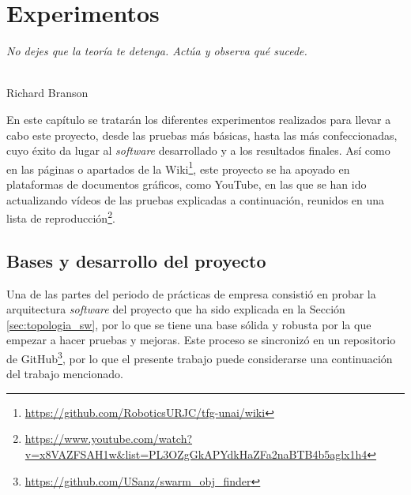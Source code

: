 \chapter{Experimentos}
\label{cap:capitulo5}

\begin{flushright}
\begin{minipage}[]{10cm}
\emph{No dejes que la teoría te detenga. Actúa y observa qué sucede.}\\
\end{minipage}\\

Richard Branson\\
\end{flushright}

\vspace{1cm}

En este capítulo se tratarán los diferentes experimentos realizados para llevar
a cabo este proyecto, desde las pruebas más básicas, hasta las más
confeccionadas, cuyo éxito da lugar al \textit{software} desarrollado y a los
resultados finales.
Así como en las páginas o apartados de la Wiki\footnote{
\url{https://github.com/RoboticsURJC/tfg-unai/wiki}}, este proyecto se ha
apoyado en plataformas de documentos gráficos, como YouTube, en las que se han
ido actualizando vídeos de las pruebas explicadas a continuación, reunidos en
una lista de reproducción\footnote{
\url{https://www.youtube.com/watch?v=x8VAZFSAH1w&list=PL3OZgGkAPYdkHaZFa2naBTB4b5aglx1h4}}.



\section{Bases y desarrollo del proyecto}
\label{sec:bases}

Una de las partes del periodo de prácticas de empresa consistió en probar la
arquitectura \textit{software} del proyecto que ha sido explicada en la Sección
\ref{sec:topologia_sw}, por lo que se tiene una base sólida y robusta por la que
empezar a hacer pruebas y mejoras.
Este proceso se sincronizó en un repositorio de GitHub\footnote{
\url{https://github.com/USanz/swarm\_obj\_finder}}, por lo que el presente
trabajo puede considerarse una continuación del trabajo mencionado.
\\

